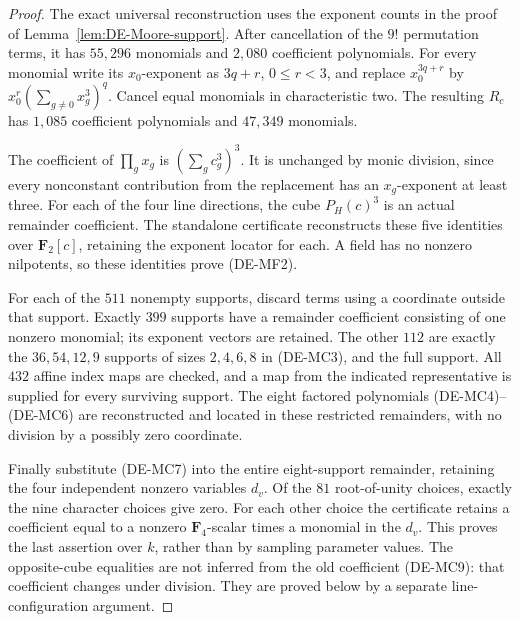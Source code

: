 \begin{proof}
The exact universal reconstruction uses the exponent counts in the
proof of Lemma~\ref{lem:DE-Moore-support}. After cancellation of the
\(9!\) permutation terms, it has \(55{,}296\) monomials and
\(2{,}080\) coefficient polynomials. For every monomial write
its \(x_0\)-exponent as \(3q+r\), \(0\le r<3\), and replace
\(x_0^{3q+r}\) by \(x_0^r(\sum_{g\ne0}x_g^3)^q\).
Cancel equal monomials in characteristic two. The resulting
\(R_c\) has \(1{,}085\) coefficient polynomials and
\(47{,}349\) monomials.

The coefficient of \(\prod_gx_g\) is
\((\sum_gc_g^3)^3\). It is unchanged by monic division, since
every nonconstant contribution from the replacement has an
\(x_g\)-exponent at least three. For each of the four line
directions, the cube \(P_H(c)^3\) is an actual remainder
coefficient. The standalone certificate reconstructs these five
identities over \(\mathbf F_2[c]\), retaining the exponent
locator for each. A field has no nonzero nilpotents, so these
identities prove (DE-MF2).

For each of the \(511\) nonempty supports, discard terms using
a coordinate outside that support. Exactly \(399\) supports
have a remainder coefficient consisting of one nonzero monomial;
its exponent vectors are retained. The other \(112\) are exactly
the \(36,54,12,9\) supports of sizes \(2,4,6,8\) in (DE-MC3),
and the full support. All \(432\) affine index maps are checked,
and a map from the indicated representative is supplied for
every surviving support. The eight factored polynomials
(DE-MC4)--(DE-MC6) are reconstructed and located in these restricted
remainders, with no division by a possibly zero coordinate.

Finally substitute (DE-MC7) into the entire eight-support
remainder, retaining the four independent nonzero variables
\(d_v\). Of the \(81\) root-of-unity choices, exactly the
nine character choices give zero. For each other choice the
certificate retains a coefficient equal to a nonzero
\(\mathbf F_4\)-scalar times a monomial in the \(d_v\).
This proves the last assertion over \(k\), rather than by
sampling parameter values. The opposite-cube equalities are
not inferred from the old coefficient (DE-MC9): that coefficient
changes under division. They are proved below by a separate
line-configuration argument.
\end{proof}

